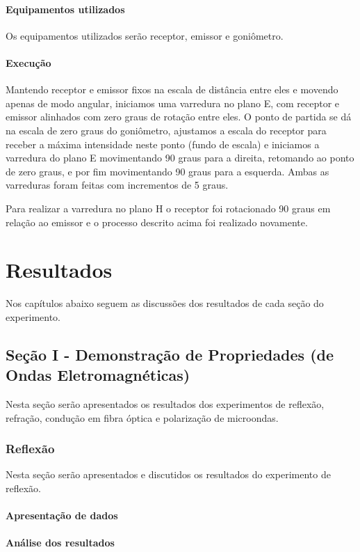 \documentclass[12pt]{article}
\begin{document}
\paragraph{Equipamentos utilizados}
Os equipamentos utilizados serão receptor, emissor e goniômetro.

\paragraph{Execução}
Mantendo receptor e emissor fixos na escala de distância entre eles e
movendo apenas de modo angular, iniciamos uma varredura no plano E,
com receptor e emissor alinhados com zero graus de rotação entre
eles. O ponto de partida se dá na escala de zero graus do goniômetro,
ajustamos a escala do receptor para receber a máxima intensidade
neste ponto (fundo de escala) e iniciamos a varredura do plano E
movimentando 90 graus para a direita, retomando ao ponto de zero
graus, e por fim movimentando 90 graus para a esquerda. Ambas as
varreduras foram feitas com incrementos de 5 graus.

Para realizar a varredura no plano H o receptor foi rotacionado 90
graus em relação ao emissor e o processo descrito acima foi realizado novamente.

\section{Resultados}
Nos capítulos abaixo seguem as discussões dos resultados de cada
seção do experimento.

\subsection{Seção I - Demonstração de Propriedades (de Ondas Eletromagnéticas)}
Nesta seção serão apresentados os resultados dos experimentos de
reflexão, refração, condução em fibra óptica e polarização de
microondas.
\subsubsection{Reflexão}
Nesta seção serão apresentados e discutidos os resultados do experimento de
reflexão.
\paragraph{Apresentação de dados}
\paragraph{Análise dos resultados}
\end{document}
